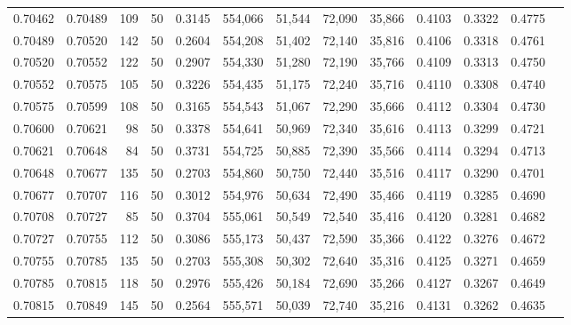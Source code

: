 \begin{tabular}{rrrrrrrrrrrrr}
0.70462 & 0.70489 &   109 &  50 &                                     0.3145 & 554,066 &  51,544 &  72,090 &  35,866 & 0.4103 & 0.3322 & 0.4775 \\
0.70489 & 0.70520 &   142 &  50 &                                     0.2604 & 554,208 &  51,402 &  72,140 &  35,816 & 0.4106 & 0.3318 & 0.4761 \\
0.70520 & 0.70552 &   122 &  50 &                                     0.2907 & 554,330 &  51,280 &  72,190 &  35,766 & 0.4109 & 0.3313 & 0.4750 \\
0.70552 & 0.70575 &   105 &  50 &                                     0.3226 & 554,435 &  51,175 &  72,240 &  35,716 & 0.4110 & 0.3308 & 0.4740 \\
0.70575 & 0.70599 &   108 &  50 &                                     0.3165 & 554,543 &  51,067 &  72,290 &  35,666 & 0.4112 & 0.3304 & 0.4730 \\
0.70600 & 0.70621 &    98 &  50 &                                     0.3378 & 554,641 &  50,969 &  72,340 &  35,616 & 0.4113 & 0.3299 & 0.4721 \\
0.70621 & 0.70648 &    84 &  50 &                                     0.3731 & 554,725 &  50,885 &  72,390 &  35,566 & 0.4114 & 0.3294 & 0.4713 \\
0.70648 & 0.70677 &   135 &  50 &                                     0.2703 & 554,860 &  50,750 &  72,440 &  35,516 & 0.4117 & 0.3290 & 0.4701 \\
0.70677 & 0.70707 &   116 &  50 &                                     0.3012 & 554,976 &  50,634 &  72,490 &  35,466 & 0.4119 & 0.3285 & 0.4690 \\
0.70708 & 0.70727 &    85 &  50 &                                     0.3704 & 555,061 &  50,549 &  72,540 &  35,416 & 0.4120 & 0.3281 & 0.4682 \\
0.70727 & 0.70755 &   112 &  50 &                                     0.3086 & 555,173 &  50,437 &  72,590 &  35,366 & 0.4122 & 0.3276 & 0.4672 \\
0.70755 & 0.70785 &   135 &  50 &                                     0.2703 & 555,308 &  50,302 &  72,640 &  35,316 & 0.4125 & 0.3271 & 0.4659 \\
0.70785 & 0.70815 &   118 &  50 &                                     0.2976 & 555,426 &  50,184 &  72,690 &  35,266 & 0.4127 & 0.3267 & 0.4649 \\
0.70815 & 0.70849 &   145 &  50 &                                     0.2564 & 555,571 &  50,039 &  72,740 &  35,216 & 0.4131 & 0.3262 & 0.4635 \\

\end{tabular}
